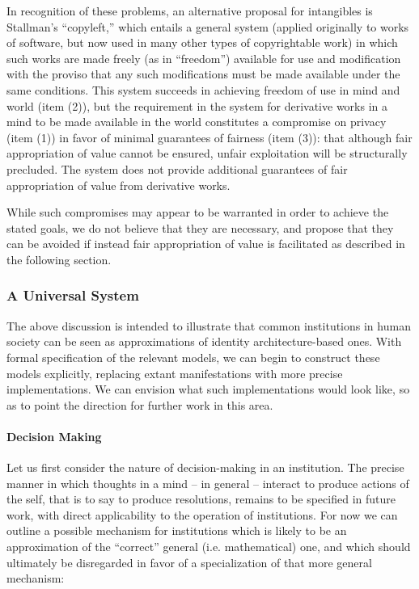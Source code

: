 \documentclass[pra,twocolumn,groupedaddress,10pt]{revtex4}
\theoremstyle{definition}
\begin{document}
In recognition of these problems, an alternative proposal for intangibles is Stallman's ``copyleft,''\cite{stallmancopyleft} which entails a general system (applied originally to works of software, but now used in many other types of copyrightable work) in which such works are made freely (as in ``freedom'') available for use and modification with the proviso that any such modifications must be made available under the same conditions. This system succeeds in achieving freedom of use in mind and world (item (2)), but the requirement in the system for derivative works in a mind to be made available in the world constitutes a compromise on privacy (item (1)) in favor of minimal guarantees of fairness (item (3)): that although fair appropriation of value cannot be ensured, unfair exploitation will be structurally precluded. The system does not provide additional guarantees of fair appropriation of value from derivative works.

While such compromises may appear to be warranted in order to achieve the stated goals, we do not believe that they are necessary, and propose that they can be avoided if instead fair appropriation of value is facilitated as described in the following section.

\subsubsection{A Universal System}

The above discussion is intended to illustrate that common institutions in human society can be seen as approximations of identity architecture-based ones. With formal specification of the relevant models, we can begin to construct these models explicitly, replacing extant manifestations with more precise implementations. We can envision what such implementations would look like, so as to point the direction for further work in this area.

\paragraph{Decision Making} Let us first consider the nature of decision-making in an institution. The precise manner in which thoughts in a mind -- in general -- interact to produce actions of the self, that is to say to produce resolutions, remains to be specified in future work, with direct applicability to the operation of institutions. For now we can outline a possible mechanism for institutions which is likely to be an approximation of the ``correct'' general (i.e. mathematical) one, and which should ultimately be disregarded in favor of a specialization of that more general mechanism:
\end{document}
